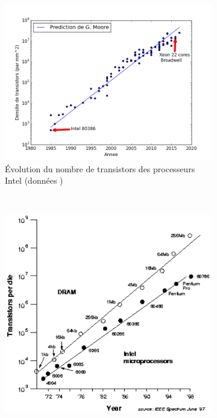         
        \begin{figure}
            \begin{subfigure}[]{0.48\linewidth}\centering
                \vspace{1cm}
                \includegraphics[width=\linewidth]{images/Chapitre1/Moore_prediction.png}
                \caption{\label{pic_Moore_prediction} Évolution du nombre de transistors des processeurs Intel (données \cite{Wikipedia2019Transistor})}
            \end{subfigure}
            ~ %
            \begin{subfigure}[]{0.48\linewidth}\centering
                \includegraphics[width=0.9\linewidth]{images/processeurs_porte_moore_dram.png}

\end{subfigure}
\end{figure}
